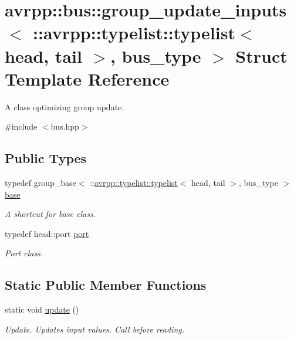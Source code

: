 \hypertarget{structavrpp_1_1bus_1_1group__update__inputs_3_01_1_1avrpp_1_1typelist_1_1typelist_3_01head_00_01tail_01_4_00_01bus__type_01_4}{
\section{avrpp::bus::group\_\-update\_\-inputs$<$ ::avrpp::typelist::typelist$<$ head, tail $>$, bus\_\-type $>$ Struct Template Reference}
\label{structavrpp_1_1bus_1_1group__update__inputs_3_01_1_1avrpp_1_1typelist_1_1typelist_3_01head_00_01tail_01_4_00_01bus__type_01_4}
}


A class optimizing group update.  




{\ttfamily \#include $<$bus.hpp$>$}

\subsection*{Public Types}
\begin{DoxyCompactItemize}
\item 
typedef group\_\-base$<$ ::\hyperlink{structavrpp_1_1typelist_1_1typelist}{avrpp::typelist::typelist}$<$ head, tail $>$, bus\_\-type $>$ \hyperlink{structavrpp_1_1bus_1_1group__update__inputs_3_01_1_1avrpp_1_1typelist_1_1typelist_3_01head_00_01tail_01_4_00_01bus__type_01_4_a08a17b67306a7ba9bc0cf28c02ad0cfa}{base}
\begin{DoxyCompactList}\small\item\em A shortcut for base class. \item\end{DoxyCompactList}\item 
typedef head::port \hyperlink{structavrpp_1_1bus_1_1group__update__inputs_3_01_1_1avrpp_1_1typelist_1_1typelist_3_01head_00_01tail_01_4_00_01bus__type_01_4_ad478bfb20ffb851d4972bb2f6ba505a4}{port}
\begin{DoxyCompactList}\small\item\em Port class. \item\end{DoxyCompactList}\end{DoxyCompactItemize}
\subsection*{Static Public Member Functions}
\begin{DoxyCompactItemize}
\item 
static void \hyperlink{structavrpp_1_1bus_1_1group__update__inputs_3_01_1_1avrpp_1_1typelist_1_1typelist_3_01head_00_01tail_01_4_00_01bus__type_01_4_aece9e3003e3f15235820f792adfb90d6}{update} ()
\begin{DoxyCompactList}\small\item\em Update. Updates input values. Call before reading. \item\end{DoxyCompactList}\end{DoxyCompactItemize}



